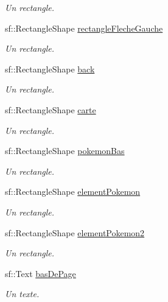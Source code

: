 \begin{DoxyCompactItemize}
\begin{DoxyCompactList}\small\item\em Un rectangle. \end{DoxyCompactList}\item 
sf\+::\+Rectangle\+Shape \hyperlink{class_s_f_m_l_pokedex_af6db22bfff2b35c6ce7f143f577b9843}{rectangle\+Fleche\+Gauche}
\begin{DoxyCompactList}\small\item\em Un rectangle. \end{DoxyCompactList}\item 
sf\+::\+Rectangle\+Shape \hyperlink{class_s_f_m_l_pokedex_a7be0bd58ffc62f4ddf173e4421337834}{back}
\begin{DoxyCompactList}\small\item\em Un rectangle. \end{DoxyCompactList}\item 
sf\+::\+Rectangle\+Shape \hyperlink{class_s_f_m_l_pokedex_a29894b0514a87a4433935300bb81817f}{carte}
\begin{DoxyCompactList}\small\item\em Un rectangle. \end{DoxyCompactList}\item 
sf\+::\+Rectangle\+Shape \hyperlink{class_s_f_m_l_pokedex_a51173885dca46730a4ed3ecd51ea7c07}{pokemon\+Bas}
\begin{DoxyCompactList}\small\item\em Un rectangle. \end{DoxyCompactList}\item 
sf\+::\+Rectangle\+Shape \hyperlink{class_s_f_m_l_pokedex_aa8a2ab411eb1fe32c6e803604e2bc089}{element\+Pokemon}
\begin{DoxyCompactList}\small\item\em Un rectangle. \end{DoxyCompactList}\item 
sf\+::\+Rectangle\+Shape \hyperlink{class_s_f_m_l_pokedex_a52190554b9cb690232c204cd1741e44e}{element\+Pokemon2}
\begin{DoxyCompactList}\small\item\em Un rectangle. \end{DoxyCompactList}\item 
sf\+::\+Text \hyperlink{class_s_f_m_l_pokedex_a663ce281a41674035ab1f632f4f26c45}{bas\+De\+Page}
\begin{DoxyCompactList}\small\item\em Un texte. \end{DoxyCompactList}\item 

\end{DoxyCompactItemize}
